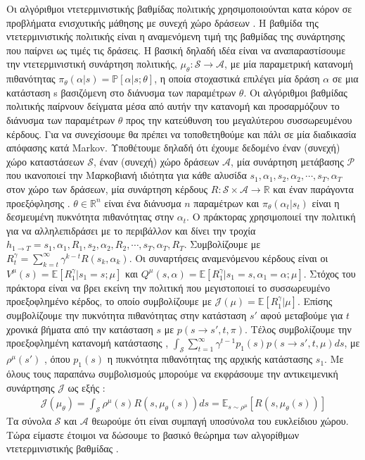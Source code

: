 \documentclass[11pt]{article} %
\numberwithin{equation}{subsection}
\begin{document}
Οι αλγόριθμοι ντετερμινιστικής βαθμίδας πολιτικής χρησιμοποιούνται κατα κόρον σε προβλήματα ενισχυτικής μάθησης με συνεχή χώρο δράσεων \cite{dpga}. Η βαθμίδα της ντετερμινιστικής πολιτικής είναι η αναμενόμενη τιμή της βαθμίδας της συνάρτησης που παίρνει ως τιμές τις δράσεις. Η βασική δηλαδή ιδέα είναι να αναπαραστίσουμε την ντετερμινιστική συνάρτηση πολιτικής, $\mu_{\theta} : \mathcal{S} \rightarrow \mathcal{A}$, με μία παραμετρική κατανομή πιθανότητας $\pi_{\theta}(\alpha | s) = \mathbb{P}[\alpha | s;\theta]$, η οποία στοχαστικά επιλέγει μία δράση $\alpha$ σε μια κατάσταση s βασιζόμενη στο διάνυσμα των παραμέτρων $\theta$. Οι αλγόριθμοι βαθμίδας πολιτικής παίρνουν δείγματα μέσα από αυτήν την κατανομή και προσαρμόζουν το διάνυσμα των παραμέτρων $\theta$ προς την κατεύθυνση του μεγαλύτερου συσσωρευμένου κέρδους. Για να συνεχίσουμε θα πρέπει να τοποθετηθούμε και πάλι σε μία διαδικασία απόφασης κατά Markov. Υποθέτουμε δηλαδή ότι έχουμε δεδομένο έναν (συνεχή) χώρο καταστάσεων $\mathcal{S}$, έναν (συνεχή) χώρο δράσεων $\mathcal{A}$, μία συνάρτηση μετάβασης $\mathcal{P}$ που ικανοποιεί την Μαρκοβιανή ιδιότητα για κάθε αλυσίδα $s_{1}, \alpha_{1}, s_{2}, \alpha_{2}, \cdots, s_{T}, \alpha_{T}$ στον χώρο των δράσεων, μία συνάρτηση κέρδους $R : \mathcal{S} \times \mathcal{A} \rightarrow \mathbb{R}$ και έναν παράγοντα προεξόφλησης \gamma. $\theta \in \mathbb{R}^{n}$ είναι ένα διάνυσμα $n$ παραμέτρων και $\pi_{\theta}(\alpha_{t}|s_{t})$ είναι η δεσμευμένη πυκνότητα πιθανότητας στην $\alpha_{t}$. Ο πράκτορας χρησιμοποιεί την πολιτική για να αλληλεπιδράσει με το περιβάλλον και δίνει την τροχία $h_{1 \rightarrow T} = s_{1}, \alpha_{1}, R_{1}, s_{2}, \alpha_{2}, R_{2}, \cdots, s_{T}, \alpha_{T}, R_{T}$. Συμβολίζουμε με $\displaystyle R^{\gamma}_{t} = \sum_{k=t}^{\infty} \gamma^{k-t}R(s_{k}, \alpha_{k})$. Οι συναρτήσεις αναμενόμενου κέρδους είναι οι $V^{\mu}(s) = \mathbb{E}[R^{\gamma}_{1}|s_{1} = s;\mu]$ και $Q^{\mu}(s,\alpha) = \mathbb{E}[R^{\gamma}_{1}|s_{1}=s, \alpha_{1}=\alpha;\mu]$. Στόχος του πράκτορα είναι να βρει εκείνη την πολιτική που μεγιστοποιεί το συσσωρευμένο προεξοφλημένο κέρδος, το οποίο συμβολίζουμε με $\mathcal{J}(\mu) = \mathbb{E}[R^{\gamma}_{1}|\mu]$. Επίσης συμβολίζουμε την πυκνότητα πιθανότητας στην κατάσταση $s'$ αφού μεταβούμε για $t$ χρονικά βήματα από την κατάσταση $s$ με $p(s \rightarrow s', t, \pi)$. Τέλος συμβολίζουμε την προεξοφλημένη κατανομή κατάστασης , $\int_{\mathcal{S}} \sum_{t=1}^{\infty} \gamma^{t-1}p_{1}(s)p(s \rightarrow s', t, \mu)ds$, με $\rho^{\mu}(s')$ \cite{dpga2}, όπου $p_{1}(s)$ η πυκνότητα πιθανότητας της αρχικής κατάστασης $s_{1}$. Με όλους τους παραπάνω συμβολισμούς μπορούμε να εκφράσουμε την αντικειμενική συνάρτησης $\mathcal{J}$ ως εξής \cite{dpga}:
\begin{align*}
\mathcal{J}(\mu_{\theta}) = \int_{\mathcal{S}} \rho^{\mu}(s) R(s,\mu_{\theta}(s))ds = \mathbb{E}_{s \sim \rho^{\mu}}[R(s,\mu_{\theta}(s))]
\end{align*}
Τα σύνολα $\mathcal{S}$ και $\mathcal{A}$ θεωρούμε ότι είναι συμπαγή υποσύνολα του ευκλείδιου χώρου. Τώρα είμαστε έτοιμοι να δώσουμε το βασικό θεώρημα των αλγορίθμων ντετερμινιστικής βαθμίδας \cite{dpga}.\\
\end{document}
